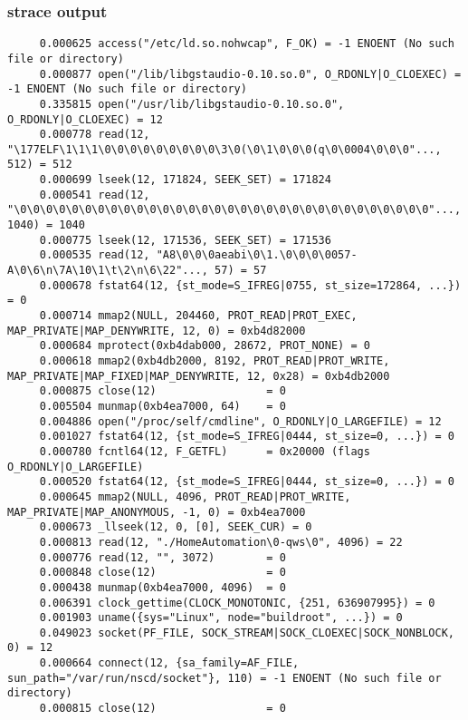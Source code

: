 \begin{frame}[fragile]
\frametitle{strace output}
\begin{block}{}
\tiny
\begin{verbatim}
     0.000625 access("/etc/ld.so.nohwcap", F_OK) = -1 ENOENT (No such file or directory)
     0.000877 open("/lib/libgstaudio-0.10.so.0", O_RDONLY|O_CLOEXEC) = -1 ENOENT (No such file or directory)
     0.335815 open("/usr/lib/libgstaudio-0.10.so.0", O_RDONLY|O_CLOEXEC) = 12
     0.000778 read(12, "\177ELF\1\1\1\0\0\0\0\0\0\0\0\0\3\0(\0\1\0\0\0(q\0\0004\0\0\0"..., 512) = 512
     0.000699 lseek(12, 171824, SEEK_SET) = 171824
     0.000541 read(12, "\0\0\0\0\0\0\0\0\0\0\0\0\0\0\0\0\0\0\0\0\0\0\0\0\0\0\0\0\0\0\0\0"..., 1040) = 1040
     0.000775 lseek(12, 171536, SEEK_SET) = 171536
     0.000535 read(12, "A8\0\0\0aeabi\0\1.\0\0\0\0057-A\0\6\n\7A\10\1\t\2\n\6\22"..., 57) = 57
     0.000678 fstat64(12, {st_mode=S_IFREG|0755, st_size=172864, ...}) = 0
     0.000714 mmap2(NULL, 204460, PROT_READ|PROT_EXEC, MAP_PRIVATE|MAP_DENYWRITE, 12, 0) = 0xb4d82000
     0.000684 mprotect(0xb4dab000, 28672, PROT_NONE) = 0
     0.000618 mmap2(0xb4db2000, 8192, PROT_READ|PROT_WRITE, MAP_PRIVATE|MAP_FIXED|MAP_DENYWRITE, 12, 0x28) = 0xb4db2000
     0.000875 close(12)                 = 0
     0.005504 munmap(0xb4ea7000, 64)    = 0
     0.004886 open("/proc/self/cmdline", O_RDONLY|O_LARGEFILE) = 12
     0.001027 fstat64(12, {st_mode=S_IFREG|0444, st_size=0, ...}) = 0
     0.000780 fcntl64(12, F_GETFL)      = 0x20000 (flags O_RDONLY|O_LARGEFILE)
     0.000520 fstat64(12, {st_mode=S_IFREG|0444, st_size=0, ...}) = 0
     0.000645 mmap2(NULL, 4096, PROT_READ|PROT_WRITE, MAP_PRIVATE|MAP_ANONYMOUS, -1, 0) = 0xb4ea7000
     0.000673 _llseek(12, 0, [0], SEEK_CUR) = 0
     0.000813 read(12, "./HomeAutomation\0-qws\0", 4096) = 22
     0.000776 read(12, "", 3072)        = 0
     0.000848 close(12)                 = 0
     0.000438 munmap(0xb4ea7000, 4096)  = 0
     0.006391 clock_gettime(CLOCK_MONOTONIC, {251, 636907995}) = 0
     0.001903 uname({sys="Linux", node="buildroot", ...}) = 0
     0.049023 socket(PF_FILE, SOCK_STREAM|SOCK_CLOEXEC|SOCK_NONBLOCK, 0) = 12
     0.000664 connect(12, {sa_family=AF_FILE, sun_path="/var/run/nscd/socket"}, 110) = -1 ENOENT (No such file or directory)
     0.000815 close(12)                 = 0
\end{verbatim}
\end{block}
\end{frame}

